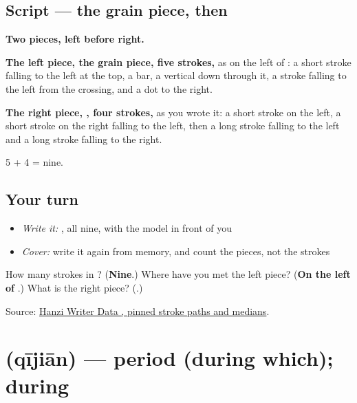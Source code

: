 \subsection*{Script — the grain piece, then }

\begin{quote}
\end{quote}

\textbf{Two pieces, left before right.}

\textbf{The left piece, the grain piece, five strokes,} as on the left of : a short stroke falling to the left at the top, a bar, a vertical down through it, a stroke falling to the left from the crossing, and a dot to the right.

\textbf{The right piece, , four strokes,} as you wrote it: a short stroke on the left, a short stroke on the right falling to the left, then a long stroke falling to the left and a long stroke falling to the right.

5 + 4 = nine.

\subsection*{Your turn}
\begin{itemize}
\raggedright
  \item \emph{Write it:} , all nine, with the model in front of you
  \item \emph{Cover:} write it again from memory, and count the pieces, not the strokes
\end{itemize}

\begin{tcolorbox}[breakable,colback=teal!4,colframe=teal!35!black,title={Before you move on}]
How many strokes in ? (\textbf{Nine}.) Where have you met the left piece? (\textbf{On the left of }.) What is the right piece? (\textbf{}.)

Source: \href{https://raw.githubusercontent.com/chanind/hanzi-writer-data/68d10a4b21150cae5e1ebbd223eed289cf32d90c/data/\%E7\%A7\%8B.json}{Hanzi Writer Data , pinned stroke paths and medians}.
\end{tcolorbox}
\section[\texorpdfstring{\zh{期间} (qījiān)}{期间 (qījiān)}]{ (qījiān) — period (during which); during}

